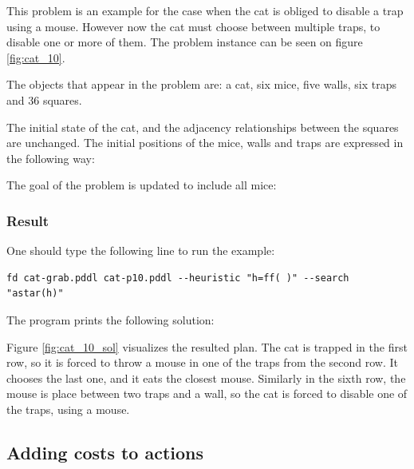 This problem is an example for the case when the cat is obliged to disable a trap using a mouse. However now the cat must choose between multiple traps, to disable one or more of them. The problem instance can be seen on figure \ref{fig:cat_10}. 

The objects that appear in the problem are: a cat, six mice, five walls, six traps and 36 squares.



The initial state of the cat, and the adjacency relationships between the squares are unchanged. The initial positions of the mice, walls and traps are expressed in the following way:

 

 
The goal of the problem is updated to include all mice:

 


\subsubsection{Result} 
\label{sec:prob_10_res}

One should type the following line to run the example: 

\begin{lstlisting}[numbers=none]
fd cat-grab.pddl cat-p10.pddl --heuristic "h=ff( )" --search "astar(h)"
\end{lstlisting}

The program prints the following solution:



Figure \ref{fig:cat_10_sol} visualizes the resulted plan. The cat is trapped in the first row, so it is forced to throw a mouse in one of the traps from the second row. It chooses the last one, and it eats the closest mouse. Similarly in the sixth row, the mouse is place between two traps and a wall, so the cat is forced to disable one of the traps, using a mouse.










\subsection{Adding costs to actions}

